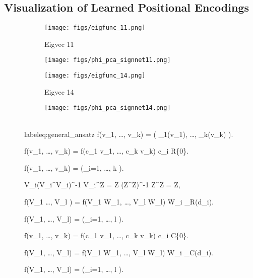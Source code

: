 \documentclass{article} \usepackage{iclr2023_conference,times}
\newcommand{\RR}{\mathbb R}
\newcommand{\CC}{\mathbb C}
\newcommand{\mrm}[1]{\mathrm{#1}}
\newcommand\norm[1]{\lVert#1\rVert}
\begin{document}
\subsection{Visualization of Learned Positional Encodings}



\begin{figure}[ht]
    \captionsetup[subfigure]{labelformat=empty}
    \centering
    
    \begin{subfigure}{.24\columnwidth}
    \centering
    \texttt{[image: figs/eigfunc\_11.png]}
    \caption{Eigvec 11}
    \end{subfigure} 
    \begin{subfigure}{.24\columnwidth}
    \centering
    \texttt{[image: figs/phi\_pca\_signnet11.png]}
    \caption{}
    \end{subfigure}  
    \begin{subfigure}{.24\columnwidth}
    \centering
    \texttt{[image: figs/eigfunc\_14.png]}
    \caption{Eigvec 14}
    \end{subfigure} 
    \begin{subfigure}{.24\columnwidth}
    \centering
    \texttt{[image: figs/phi\_pca\_signnet14.png]}
    \caption{}
    \end{subfigure} \\label{eq:general_ansatz}
        f(v_1, \ldots, v_k) = \rho( \phi_1(v_1), \ldots,  \phi_k(v_k) ).
    
    f(v_1, \ldots, v_k) = f(c_1 v_1, \ldots, c_k v_k) \qquad c_i \in \RR \setminus \{0\}.

    f(v_1, \ldots, v_k) = \rho\left(\left[\phi(v_i/ \norm{v_i}) + \phi(-v_i/\norm{v_i}) \right]_{i=1, \ldots, k} \right).

    V_i(V_i^\top V_i)^{-1} V_i^\top Z = Z (Z^\top Z)^{-1} Z^\top Z = Z,

    f(V_1 \ldots, V_l ) = f(V_1 W_1, \ldots, V_l W_l) \qquad W_i \in \mrm{GL}_\RR(d_i).

    f(V_1, \ldots, V_l) = \rho\left(_{i=1, \ldots, l} \right).

    f(v_1, \ldots, v_k) = f(c_1 v_1, \ldots, c_k v_k) \qquad c_i \in \CC \setminus \{0\}.

    f(V_1, \ldots, V_l) = f(V_1 W_1, \ldots, V_l W_l) \qquad W_i \in \mrm{GL}_{\CC}(d_i).

    f(V_1, \ldots, V_l) = \rho\left(_{i=1, \ldots, l} \right).


\end{figure}
\end{document}
